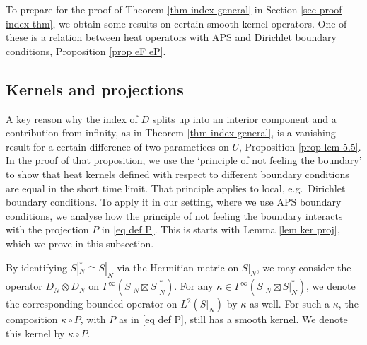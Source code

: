 \documentclass[11pt]{article}
\theoremstyle{plain}
\theoremstyle{definition}
\theoremstyle{remark}
\numberwithin{equation}{section}
\begin{document}
To prepare for the proof of Theorem \ref{thm index general} in Section \ref{sec proof index thm}, we obtain some results on certain smooth kernel operators. One of these is a relation between heat operators with APS and Dirichlet boundary conditions, Proposition \ref{prop eF eP}.

\subsection{Kernels and projections}\label{sec ker proj}

A key reason why the index of $D$ splits up into an interior component and a contribution from infinity, as in Theorem \ref{thm index general}, is a vanishing result for a certain difference of two parametices on $U$, Proposition \ref{prop lem 5.5}. In the proof of that proposition, we use the `principle of not feeling the boundary' to show that heat kernels defined with respect to different boundary conditions are equal in the short time limit. That principle applies to local, e.g.\ Dirichlet boundary conditions. To apply it in our setting, where we use APS boundary conditions, we analyse how the principle of not feeling the boundary interacts with the projection $P$ in \eqref{eq def P}. This is starts with Lemma \ref{lem ker proj}, which we prove in this subsection.

By identifying $S|_N^* \cong S|_N$ via the Hermitian metric on $S|_N$, we may consider the operator
$D_N\otimes D_N$ on $\Gamma^{\infty} (S|_N \boxtimes S|_N^*)$. For any $\kappa \in \Gamma^{\infty}(S|_N \boxtimes S|_N^*)$, we denote the corresponding bounded operator on $L^2(S|_N)$ by $\kappa$ as well. For such a $\kappa$,  the composition $ \kappa \circ P$, with $P$ as in \eqref{eq def P}, still has a smooth kernel. We denote this kernel by $\kappa \circ P$.
\end{document}
